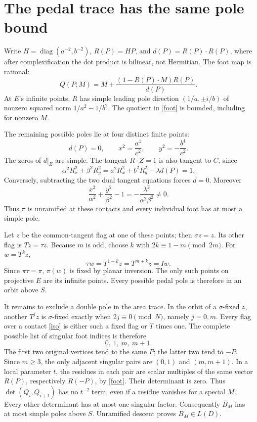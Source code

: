 \documentclass[11pt]{article}
\newcommand{\pp}{\pi}
\DeclareMathOperator{\diag}{diag}
\begin{document}
\section{The pedal trace has the same pole bound}
Write \(H=\diag(a^{-2},b^{-2})\), \(R(P)=HP\), and
\(d(P)=R(P)\cdot R(P)\), where after complexification the dot product is
bilinear, not Hermitian. The foot map is rational:
\begin{equation}\label{foot}
 Q(P;M)=M+\frac{(1-R(P)\cdot M)R(P)}{d(P)} .
\end{equation}
At \(E\)'s infinite points, \(R\) has simple leading pole direction
\((1/a,\pm i/b)\) of nonzero squared norm \(1/a^2-1/b^2\).
The quotient in \eqref{foot} is bounded, including for nonzero \(M\).

The remaining possible poles lie at four distinct finite points:
\begin{equation}\label{iso}
 d(P)=0,\qquad x^2=\frac{a^4}{c^2},\qquad y^2=-\frac{b^4}{c^2}.
\end{equation}
The zeros of \(d|_E\) are simple. The tangent \(R\cdot Z=1\) is
also tangent to \(C\), since
\[
 \alpha^2R_x^2+\beta^2R_y^2
 =a^2R_x^2+b^2R_y^2-\lambda d(P)=1 .
\]
Conversely, subtracting the two dual tangent equations forces \(d=0\).
Moreover
\[
 \frac{x^2}{\alpha^2}+\frac{y^2}{\beta^2}-1
 =-\frac{\lambda^2}{\alpha^2\beta^2}\ne0 .
\]
Thus \(\pp\) is unramified at these contacts and every individual foot
has at most a simple pole.

Let \(z\) be the common-tangent flag at one of these points; then
\(\sigma z=z\). Its other flag is \(Tz=\tau z\).
Because \(m\) is odd, choose \(k\) with \(2k\equiv1-m\pmod{2m}\).
For \(w=T^kz\),
\[
 \tau w=T^{1-k}z=T^{m+k}z=Iw .
\]
Since \(\pp\tau=\pp\), \(\pp(w)\) is fixed by planar inversion.
The only such points on projective \(E\) are its infinite points.
Every possible pedal pole is therefore in an orbit above \(S\).

It remains to exclude a double pole in the area trace. In the orbit
of a \(\sigma\)-fixed \(z\), another \(T^jz\) is \(\sigma\)-fixed exactly
when \(2j\equiv0\pmod N\), namely \(j=0,m\).
Every flag over a contact \eqref{iso} is either such a fixed flag or
\(T\) times one. The complete possible list of singular foot indices
is therefore
\[
 0,\ 1,\ m,\ m+1 .
\]
The first two original vertices tend to the same \(P\); the latter two
tend to \(-P\). Since \(m\geq3\), the only adjacent singular pairs are
\((0,1)\) and \((m,m+1)\). In a local parameter \(t\), the residues in
each pair are scalar multiples of the same vector \(R(P)\), respectively
\(R(-P)\), by \eqref{foot}. Their determinant is zero. Thus
\(\det(Q_i,Q_{i+1})\) has no \(t^{-2}\) term, even if a residue vanishes
for a special \(M\). Every other determinant has at most one singular
factor. Consequently \(B_M\) has at most simple poles above \(S\).
Unramified descent proves \(B_M\in L(D)\).
\end{document}
